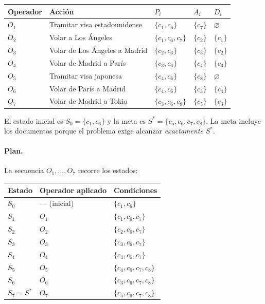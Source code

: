 \documentclass[11pt,letterpaper]{article}
\theoremstyle{plain}
\theoremstyle{definition}
\theoremstyle{remark}
\newcommand{\vacio}{\varnothing}
\begin{document}
\begin{center}
\small
\begin{tabular}{@{}lllll@{}}
\toprule
Operador & Acción & $P_i$ & $A_i$ & $D_i$\\
\midrule
$O_1$ & Tramitar visa estadounidense & $\{c_1,c_6\}$     & $\{c_7\}$ & $\vacio$\\
$O_2$ & Volar a Los Ángeles          & $\{c_1,c_6,c_7\}$ & $\{c_2\}$ & $\{c_1\}$\\
$O_3$ & Volar de Los Ángeles a Madrid & $\{c_2,c_6\}$    & $\{c_3\}$ & $\{c_2\}$\\
$O_4$ & Volar de Madrid a París      & $\{c_3,c_6\}$     & $\{c_4\}$ & $\{c_3\}$\\
$O_5$ & Tramitar visa japonesa       & $\{c_4,c_6\}$     & $\{c_8\}$ & $\vacio$\\
$O_6$ & Volar de París a Madrid      & $\{c_4,c_6\}$     & $\{c_3\}$ & $\{c_4\}$\\
$O_7$ & Volar de Madrid a Tokio      & $\{c_3,c_6,c_8\}$ & $\{c_5\}$ & $\{c_3\}$\\
\bottomrule
\end{tabular}
\end{center}

El estado inicial es $S_0=\{c_1,c_6\}$ y la meta es
$S^{*}=\{c_5,c_6,c_7,c_8\}$. La meta incluye los documentos
porque el problema exige alcanzar \emph{exactamente} $S^{*}$.

\paragraph{Plan.}
La secuencia $O_1,\dots,O_7$ recorre los estados:

\begin{center}
\small
\begin{tabular}{@{}lll@{}}
\toprule
Estado & Operador aplicado & Condiciones\\
\midrule
$S_0$ & --- (inicial) & $\{c_1,c_6\}$\\
$S_1$ & $O_1$ & $\{c_1,c_6,c_7\}$\\
$S_2$ & $O_2$ & $\{c_2,c_6,c_7\}$\\
$S_3$ & $O_3$ & $\{c_3,c_6,c_7\}$\\
$S_4$ & $O_4$ & $\{c_4,c_6,c_7\}$\\
$S_5$ & $O_5$ & $\{c_4,c_6,c_7,c_8\}$\\
$S_6$ & $O_6$ & $\{c_3,c_6,c_7,c_8\}$\\
$S_7=S^{*}$ & $O_7$ & $\{c_5,c_6,c_7,c_8\}$\\
\bottomrule
\end{tabular}
\end{center}
\end{document}
